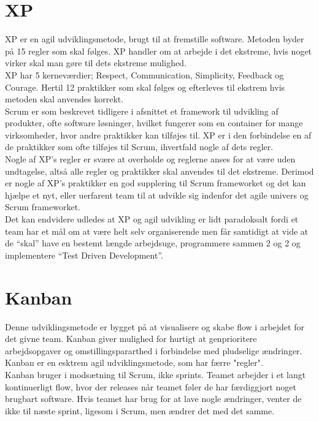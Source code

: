 \section{XP}\label{sec:xp}
XP er en agil udviklingsmetode, brugt til at fremstille software. Metoden byder på 15 regler som skal følges. XP handler om at arbejde i det ekstreme, 
hvis noget virker skal man gøre til dets ekstreme mulighed.  \\

XP har 5 kerneværdier; Respect, Communication, Simplicity, Feedback og Courage. Hertil 12 praktikker som 
skal følges og efterleves til ekstrem hvis metoden skal anvendes korrekt. \\

Scrum er som beskrevet tidligere i afsnittet et framework til udvikling af produkter, ofte software løsninger, 
hvilket fungerer som en container for mange virksomheder, hvor andre praktikker kan tilføjes til. XP er i den 
forbindelse en af de praktikker som ofte tilføjes til Scrum, ihvertfald nogle af dets regler. \\

Nogle af XP’s regler er svære at overholde og reglerne anses for at være uden undtagelse, altså alle regler 
og praktikker skal anvendes til det ekstreme. Derimod er nogle af XP’s praktikker en god supplering til 
Scrum frameworket og det kan hjælpe et nyt, eller uerfarent team til at udvikle sig indenfor det agile 
univers og Scrum frameworket. \\

Det kan endvidere udledes at XP og agil udvikling er lidt paradoksalt fordi et team har et mål om at være helt selv organiserende men får 
samtidigt at vide at de “skal” have en bestemt længde arbejdsuge, programmere sammen 2 og 2 og implementere “Test Driven Development”. 

\section{Kanban}\label{sec:kanban}
Denne udviklingsmetode er bygget på at visualisere og skabe flow i arbejdet for det givne team. Kanban giver 
mulighed for hurtigt at genprioritere arbejdsopgaver og omstillingspararthed i forbindelse med pludselige ændringer. 
Kanban er en esktrem agil udviklingsmetode, som har færre "regler".\\

Kanban\cite{Kanban} bruger i modsætning til Scrum, ikke sprints. Teamet arbejder i et langt kontinuerligt flow, hvor der releases
når teamet føler de har færdiggjort noget brugbart software. Hvis teamet har brug for at lave nogle ændringer,
venter de ikke til næste sprint, ligesom i Scrum, men ændrer det med det samme. \\

